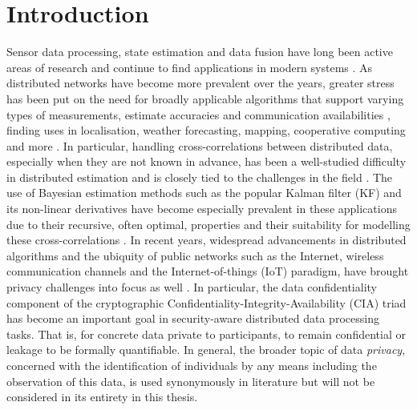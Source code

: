 
\chapter{Introduction}\label{ch:intro}
Sensor data processing, state estimation and data fusion have long been active areas of research and continue to find applications in modern systems \cite{andersonOptimalFiltering1979,simonOptimalStateEstimation2006}. As distributed networks have become more prevalent over the years, greater stress has been put on the need for broadly applicable algorithms that support varying types of measurements, estimate accuracies and communication availabilities \cite{mutambaraDecentralizedEstimationControl1998,ligginsDistributedDataFusion2012}, finding uses in localisation, weather forecasting, mapping, cooperative computing and more \cite{galanisApplicationsKalmanFilters2006,gillijnsWhatEnsembleKalman2006,geziciLocalizationUltraWidebandRadios2005,sieblerLocalizationMagneticField2020,kiaCooperativeLocalizationMobile2016,sridharCooperativePerceptionAutonomous2019,aulinasSLAMProblemSurvey2008}. In particular, handling cross-correlations between distributed data, especially when they are not known in advance, has been a well-studied difficulty in distributed estimation and is closely tied to the challenges in the field \cite{julierNondivergentEstimationAlgorithm1997,grimeDataFusionDecentralized1994,noackTreatmentDependentInformation2017,radtkeReconstructionCrossCorrelationsConstant2018}. The use of Bayesian estimation methods such as the popular Kalman filter (KF) and its non-linear derivatives have become especially prevalent in these applications due to their recursive, often optimal, properties and their suitability for modelling these cross-correlations \cite{chongFortyYearsDistributed2017,haugBayesianEstimationTracking2012,willnerKalmanFilterAlgorithms1976,pfaffInformationFormDistributed2017}. In recent years, widespread advancements in distributed algorithms and the ubiquity of public networks such as the Internet, wireless communication channels and the Internet-of-things (IoT) paradigm, have brought privacy challenges into focus as well \cite{brennerSecretProgramExecution2011,renSecurityChallengesPublic2012}. In particular, the data confidentiality component of the cryptographic Confidentiality-Integrity-Availability (CIA) triad \cite{keyserSecurityPolicy2005} has become an important goal in security-aware distributed data processing tasks. That is, for concrete data private to participants, to remain confidential or leakage to be formally quantifiable. In general, the broader topic of data \textit{privacy}, concerned with the identification of individuals by any means including the observation of this data, is used synonymously in literature \cite{farokhiPrivacyDynamicalSystems2020,specialePrivacyPreservingImageBased2019,erkinPrivacyPreservingFaceRecognition2009,hePreservingDataPrivacyAdded2018,liPrivacyPreservingDistributedOptimization2020} but will not be considered in its entirety in this thesis.

